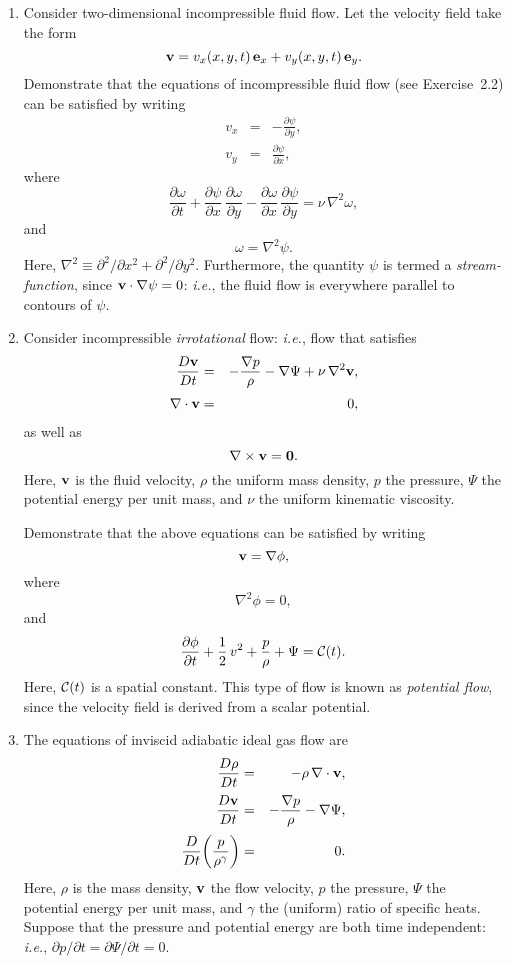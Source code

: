 {\begin{enumerate}
 Derive the following {\em vorticity evolution equation}\/ from
 the Navier-Stokes equation:
 $$
 \frac{D\bomega}{Dt} = (\bomega\cdot\nabla)\,{\bf v} + \nu\,\nabla^2\bomega.
 $$
 
 \item Consider two-dimensional incompressible fluid flow. Let the velocity field take the form
 $$
 {\bf v} = v_x(x,y,t)\,{\bf e}_x + v_y(x,y,t)\,{\bf e}_y.
 $$
 Demonstrate that the equations of incompressible fluid flow (see Exercise~2.2) can be satisfied by writing
 \begin{eqnarray}
 v_x &=&-\frac{\partial \psi}{\partial y},\nonumber\\[0.5ex]
 v_y&=&\frac{\partial\psi}{\partial x},\nonumber
 \end{eqnarray}
 where
 $$
 \frac{\partial\omega}{\partial t}+\frac{\partial\psi}{\partial x}\,\frac{\partial \omega}{\partial y} -\frac{\partial\omega}{\partial x}\, \frac{\partial\psi}{\partial y} = \nu\,\nabla^2\omega,
 $$
 and
 $$
 \omega = \nabla^2\psi.
 $$
 Here, $\nabla^2\equiv \partial^2/\partial x^2+ \partial^2/\partial y^2$. Furthermore, the quantity $\psi$ is termed a {\em stream-function}, 
 since ${\bf v}\cdot\nabla\psi = 0$: {\em i.e.}, the fluid flow is everywhere parallel to contours of $\psi$. 
 
 \item Consider incompressible {\em irrotational}\/ flow: {\em i.e.}, flow that satisfies
 \begin{eqnarray}
 \frac{D{\bf v}}{Dt} &=& -\frac{\nabla p}{\rho} -\nabla\Psi +\nu\,\nabla^2{\bf v},\nonumber\\[0.5ex]
 \nabla\cdot{\bf v} &=& 0,\nonumber
 \end{eqnarray}
 as well as
 $$
 \nabla\times {\bf v} = {\bf 0}.
 $$
 Here, ${\bf v}$ is the fluid velocity, $\rho$ the uniform mass density, $p$ the pressure, $\Psi$ the potential energy
 per unit mass, and $\nu$ the uniform kinematic viscosity. 
 
 Demonstrate that the above equations can
 be satisfied by writing
 $$
 {\bf v}= \nabla\phi,
 $$
 where
 $$
 \nabla^2\phi = 0,
 $$
 and
 $$
 \frac{\partial\phi}{\partial t} + \frac{1}{2}\,v^2+ \frac{p}{\rho} + \Psi ={\cal C}(t).
 $$
 Here, ${\cal C}(t)$ is a spatial constant. This type of flow is known as {\em potential flow}, since the velocity
 field is derived from a scalar potential. 
 
 \item The equations of  inviscid adiabatic  ideal gas flow are
 \begin{eqnarray}
 \frac{D\rho}{Dt} &=&-\rho\,\nabla\cdot{\bf v},\nonumber\\[0.5ex]
 \frac{D{\bf v}}{Dt} &=& - \frac{\nabla p}{\rho} - \nabla\Psi,\nonumber\\[0.5ex]
 \frac{D}{Dt}\!\left(\frac{p}{\rho^\gamma}\right) &=& 0.\nonumber
 \end{eqnarray}
 Here, $\rho$ is the mass density, ${\bf v}$ the flow velocity, $p$ the pressure, $\Psi$ the
 potential energy per unit mass, and $\gamma$ the (uniform) ratio of specific heats. 
 Suppose that the pressure and potential energy are both time independent: {\em i.e.}, $\partial p/\partial t=
 \partial\Psi/\partial t=0$. 
 

\end{enumerate}}
